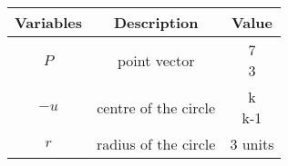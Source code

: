 \begin{tabular}[12pt]{ |c| c| c|}
    \hline
	\textbf{Variables} & \textbf{Description}&\textbf{Value}\\ 
    \hline
	$P$ & point vector & \myvec{7\\3}\\
    \hline 
	$-u$ & centre of the circle & \myvec{k\\k-1}\\
    \hline
	$r$ & radius of the circle & 3 units\\
    \hline
    \end{tabular}
